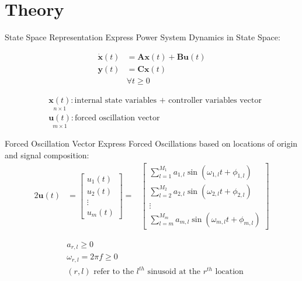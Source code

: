 \section[Theory]{Theory}
\label{sec:lasso_theory}

\begin{frame}[fragile]{State Space Representation}
	Express Power System Dynamics in State Space:

	\begin{align*}
		\dot{\textbf{x}}(t) &= 
		\textbf{A}\textbf{x}(t)
		+ \textbf{B}\textbf{u}(t)\\
		\textbf{y}(t) &= 
		\textbf{C}\textbf{x}(t)\\  
		& \forall t\geq0	
	\end{align*}
	
	\begin{align*}
		& \underset{\scriptscriptstyle n\times 1}{\textbf{x}(t)} : \text{internal state variables + controller variables vector}                                                                      \\
		& \underset{\scriptscriptstyle m\times 1}{\textbf{u}(t)} : \text{forced oscillation vector}
	\end{align*}
\end{frame}

\begin{frame}[fragile]{Forced Oscillation Vector}
	Express Forced Oscillations based on locations of origin and signal composition:
	\begin{alignat*}{2}
		\textbf{u}(t) 
		&= 
		\begin{bmatrix}
			u_1(t) \\
			u_2(t) \\
			\vdots \\
			u_m(t)
		\end{bmatrix} 
		=&	
		\begin{bmatrix}
			\sum_{l=1}^{M_1} a_{1,l} \sin(\omega_{1,l}t + \phi_{1,l}) \\
			\sum_{l=2}^{M_2} a_{2,l} \sin(\omega_{2,l}t + \phi_{2,l}) \\
			\vdots \\
			\sum_{l=m}^{M_m} a_{m,l} \sin(\omega_{m,l}t + \phi_{m,l})
		\end{bmatrix} 
	\end{alignat*}
	
	\begin{align*}
		& a_{r,l} \geq0 \\
		& \omega_{r,l} = 2\pi f \geq 0 \\
		& (r,l) \text{ refer to the } l^{th} \text{ sinusoid at the }  r^{th} \text{ location}
	\end{align*}

\end{frame}